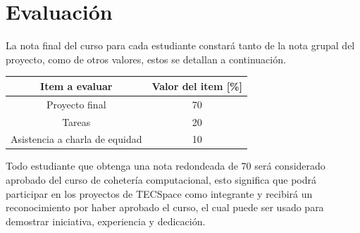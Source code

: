 ﻿\documentclass[letterpaper]{article}
\begin{document}
\clearpage

\section{Evaluación}
La nota final del curso para cada estudiante constará tanto de la nota
grupal del proyecto, como de otros valores, estos se detallan a continuación.
\begin{table}[h]
    \centering
    \begin{tabular}{cc}
        \toprule
            Item a evaluar & Valor del item [\%] \\
        \midrule
            Proyecto final & 70 \\
            Tareas & 20 \\
            Asistencia a charla de equidad  & 10 \\
        \bottomrule
    \end{tabular}
\end{table}

Todo estudiante que obtenga una nota redondeada de 70 será considerado aprobado del curso de cohetería
computacional, esto significa que podrá participar en los proyectos de TECSpace como integrante y
recibirá un reconocimiento por haber aprobado el curso, el cual puede ser usado para demostrar
iniciativa, experiencia y dedicación.
\end{document}
